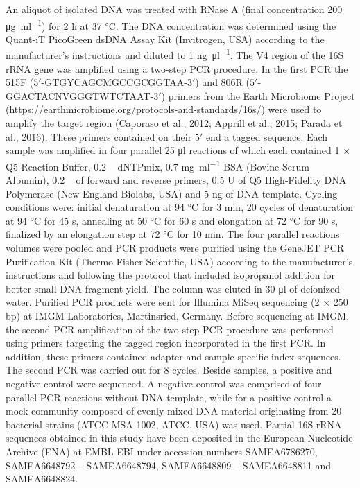 \documentclass[12pt,]{article}
\begin{document}
An aliquot of isolated DNA was treated with RNase A (final concentration
200 \si{\ug\per\ml}) for 2 \si{\hour} at 37 \si{\degreeCelsius}. The DNA
concentration was determined using the Quant-iT PicoGreen dsDNA Assay
Kit (Invitrogen, USA) according to the manufacturer's instructions and
diluted to 1 \si{\ng\per\ul}. The V4 region of the 16S rRNA gene was
amplified using a two-step PCR procedure. In the first PCR the 515F
(\(5'\)-GTGYCAGCMGCCGCGGTAA-\(3'\)) and 806R
(\(5'\)-GGACTACNVGGGTWTCTAAT-\(3'\)) primers from the Earth Microbiome
Project (\url{https://earthmicrobiome.org/protocols-and-standards/16s/})
were used to amplify the target region (Caporaso et al., 2012; Apprill
et al., 2015; Parada et al., 2016). These primers contained on their
\(5'\) end a tagged sequence. Each sample was amplified in four parallel
25 \si{\ul} reactions of which each contained 1 × Q5 Reaction Buffer,
0.2 \si{\milli\Molar} dNTPmix, 0.7 \si{\mg\per\ml} BSA (Bovine Serum
Albumin), 0.2 \si{\micro\Molar} of forward and reverse primers, 0.5 U of
Q5 High-Fidelity DNA Polymerase (New England Biolabs, USA) and 5
\si{\ng} of DNA template. Cycling conditions were: initial denaturation
at 94 \si{\degreeCelsius} for 3 \si{\minute}, 20 cycles of denaturation
at 94 \si{\degreeCelsius} for 45 \si{\s}, annealing at 50
\si{\degreeCelsius} for 60 \si{\s} and elongation at 72
\si{\degreeCelsius} for 90 \si{\s}, finalized by an elongation step at
72 \si{\degreeCelsius} for 10 \si{\minute}. The four parallel reactions
volumes were pooled and PCR products were purified using the GeneJET PCR
Purification Kit (Thermo Fisher Scientific, USA) according to the
manufacturer's instructions and following the protocol that included
isopropanol addition for better small DNA fragment yield. The column was
eluted in 30 \si{\ul} of deionized water. Purified PCR products were
sent for Illumina MiSeq sequencing (2 × 250 bp) at IMGM Laboratories,
Martinsried, Germany. Before sequencing at IMGM, the second PCR
amplification of the two-step PCR procedure was performed using primers
targeting the tagged region incorporated in the first PCR. In addition,
these primers contained adapter and sample-specific index sequences. The
second PCR was carried out for 8 cycles. Beside samples, a positive and
negative control were sequenced. A negative control was comprised of
four parallel PCR reactions without DNA template, while for a positive
control a mock community composed of evenly mixed DNA material
originating from 20 bacterial strains (ATCC MSA-1002, ATCC, USA) was
used. Partial 16S rRNA sequences obtained in this study have been
deposited in the European Nucleotide Archive (ENA) at EMBL-EBI under
accession numbers SAMEA6786270, SAMEA6648792 -- SAMEA6648794,
SAMEA6648809 -- SAMEA6648811 and SAMEA6648824.
\end{document}
